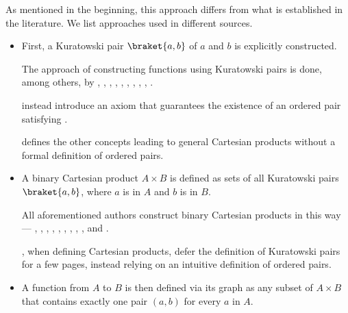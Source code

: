\begin{remark}
  As mentioned in the beginning, this approach differs from what is established in the literature. We list approaches used in different sources.
  \begin{itemize}
    \item First, a Kuratowski pair \( \braket{ a, b } \) of \( a \) and \( b \) is explicitly constructed.

    The approach of constructing functions using Kuratowski pairs is done, among others, by
    ,
    ,
    ,
    ,
    ,
    ,
    ,
    ,
    ,
    .

     instead introduce an axiom that guarantees the existence of an ordered pair satisfying .

     defines the other concepts leading to general Cartesian products without a formal definition of ordered pairs.

    \item A binary Cartesian product \( A \times B \) is defined as sets of all Kuratowski pairs \( \braket{ a, b } \), where \( a \) is in \( A \) and \( b \) is in \( B \).

    All aforementioned authors construct binary Cartesian products in this way ---
    ,
    ,
    ,
    ,
    ,
    ,
    ,
    ,
    ,
     and
    .

    , when defining Cartesian products, defer the definition of Kuratowski pairs for a few pages, instead relying on an intuitive definition of ordered pairs.

    \item A function from \( A \) to \( B \) is then defined via its graph as any subset of \( A \times B \) that contains exactly one pair \( (a, b) \) for every \( a \) in \( A \).


\end{itemize}
\end{remark}
